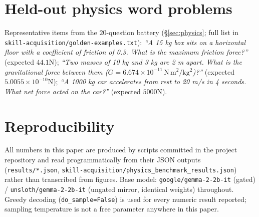 \documentclass[11pt]{article}
\newcommand{\mt}[1]{\texttt{\small #1}}
\begin{document}
\section{Held-out physics word problems}
\label{app:physics}
Representative items from the $20$-question battery (\S\ref{sec:physics}; full list in \mt{skill-acquisition/golden-examples.txt}): \emph{``A 15 kg box sits on a horizontal floor with a coefficient of friction of 0.3. What is the maximum friction force?''} (expected $44.1$N); \emph{``Two masses of 10 kg and 3 kg are 2 m apart. What is the gravitational force between them ($G=6.674\times10^{-11}\,\mathrm{N\,m^2/kg^2}$)?''} (expected $5.0055\times10^{-10}$N); \emph{``A 1000 kg car accelerates from rest to 20 m/s in 4 seconds. What net force acted on the car?''} (expected $5000$N).

\section{Reproducibility}
\label{app:repro}
All numbers in this paper are produced by scripts committed in the project repository and read programmatically from their JSON outputs (\mt{results/*.json}, \mt{skill-acquisition/physics\_benchmark\_results.json}) rather than transcribed from figures. Base model: \mt{google/gemma-2-2b-it} (gated) / \mt{unsloth/gemma-2-2b-it} (ungated mirror, identical weights) throughout. Greedy decoding (\mt{do\_sample=False}) is used for every numeric result reported; sampling temperature is not a free parameter anywhere in this paper.
\end{document}
